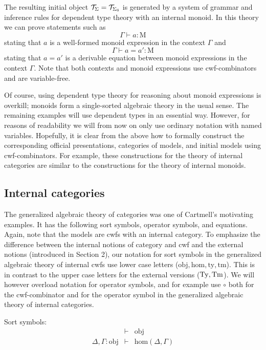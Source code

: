 \documentclass{lmcs}
\newcommand{\FYI}[1]{{\color{red}#1}}
\def\Obj{\mathrm{obj}}
\def\Hom{\mathrm{hom}}
\def\Mon{\mathrm{M}}
\newcommand{\ty}{\mathrm{ty}}
\newcommand{\tm}{\mathrm{tm}}
\begin{document}
The resulting initial object ${\mathcal T}_\Sigma = {\mathcal T}_{\Sigma_6}$ is generated by a system of grammar and inference rules for dependent type theory with an internal monoid. In this theory we can prove statements such as
$$
\Gamma \vdash a : \Mon
$$
stating that $a$ is a well-formed monoid expression in the context $\Gamma$ and
$$
\Gamma \vdash a = a': \Mon
$$
stating that $a = a'$ is a derivable equation between monoid expressions in the context $\Gamma$. Note that both contexts and monoid expressions use cwf-combinators and are variable-free.

Of course, using dependent type theory for reasoning about monoid expressions is overkill; monoids form a single-sorted algebraic theory in the usual sense.
The remaining examples will use dependent types in an essential way. However, for reasons of readability we will from now on only use ordinary notation with named variables. Hopefully, it is clear from the above how to formally construct the corresponding official \FYI{presentations}, categories of models, and initial models using cwf-combinators. For example, these constructions for the theory of internal categories are similar to the constructions for the theory of internal monoids.


\subsection{Internal categories} The generalized algebraic theory of categories was one of Cartmell's motivating examples. It has the following sort symbols, operator symbols, and equations. Again, note that the models are cwfs with an internal category. To emphasize the difference between the internal notions of category and cwf and the external notions (introduced in Section 2), our notation for sort symbols in the generalized algebraic theory of internal cwfs use lower case letters ($\Obj, \Hom, \ty, \tm$). This is in contrast to the upper case letters for the external versions ($\mathrm{Ty}, \mathrm{Tm}$). We will however overload notation for operator symbols, and for example use $\circ$ both for the cwf-combinator and for the operator symbol in the generalized algebraic theory of internal categories.

Sort symbols:
\begin{eqnarray*}
&\vdash& \Obj\\
\Delta, \Gamma : \Obj &\vdash& \Hom(\Delta,\Gamma)\\
\end{eqnarray*}
\end{document}
